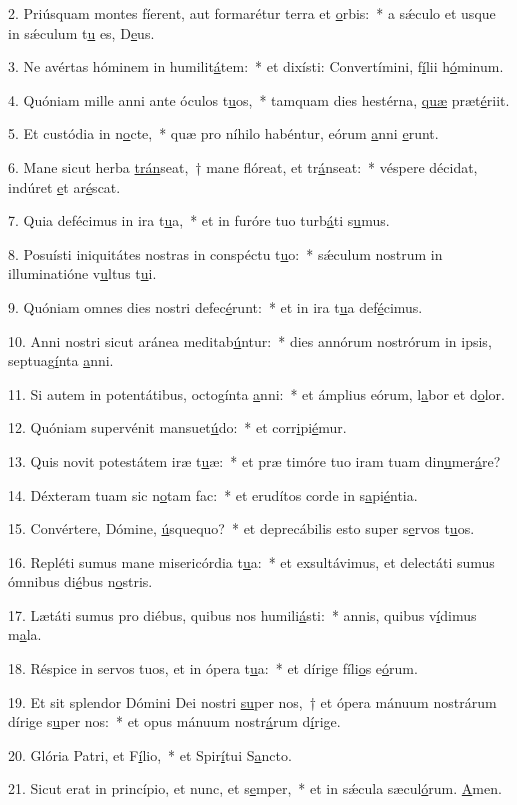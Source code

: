 2. Priúsquam montes fíerent, aut formarétur terra et \uline{o}rbis:~* a sǽculo et usque in sǽculum t\uline{u} es, D\uline{e}us.\par 
3. Ne avértas hóminem in humilit\uline{á}tem:~* et dixísti: Convertímini, f\uline{í}lii h\uline{ó}minum.\par 
4. Quóniam mille anni ante óculos t\uline{u}os,~* tamquam dies hestérna, \uline{quæ} præt\uline{é}riit.\par 
5. Et custódia in n\uline{o}cte,~* quæ pro níhilo habéntur, eórum \uline{a}nni \uline{e}runt.\par 
6. Mane sicut herba \uline{trán}seat,~† mane flóreat, et tr\uline{á}nseat:~* véspere décidat, indúret \uline{e}t ar\uline{é}scat.\par 
7. Quia defécimus in ira t\uline{u}a,~* et in furóre tuo turb\uline{á}ti s\uline{u}mus.\par 
8. Posuísti iniquitátes nostras in conspéctu t\uline{u}o:~* sǽculum nostrum in illuminatióne v\uline{u}ltus t\uline{u}i.\par 
9. Quóniam omnes dies nostri defec\uline{é}runt:~* et in ira t\uline{u}a def\uline{é}cimus.\par 
10. Anni nostri sicut aránea meditab\uline{ú}ntur:~* dies annórum nostrórum in ipsis, septuag\uline{í}nta \uline{a}nni.\par 
11. Si autem in potentátibus, octogínta \uline{a}nni:~* et ámplius eórum, l\uline{a}bor et d\uline{o}lor.\par 
12. Quóniam supervénit mansuet\uline{ú}do:~* et corr\uline{i}pi\uline{é}mur.\par 
13. Quis novit potestátem iræ t\uline{u}æ:~* et præ timóre tuo iram tuam din\uline{u}mer\uline{á}re?\par 
14. Déxteram tuam sic n\uline{o}tam fac:~* et erudítos corde in s\uline{a}pi\uline{é}ntia.\par 
15. Convértere, Dómine, \uline{ú}squequo?~* et deprecábilis esto super s\uline{e}rvos t\uline{u}os.\par 
16. Repléti sumus mane misericórdia t\uline{u}a:~* et exsultávimus, et delectáti sumus ómnibus di\uline{é}bus n\uline{o}stris.\par 
17. Lætáti sumus pro diébus, quibus nos humili\uline{á}sti:~* annis, quibus v\uline{í}dimus m\uline{a}la.\par 
18. Réspice in servos tuos, et in ópera t\uline{u}a:~* et dírige fíli\uline{o}s e\uline{ó}rum.\par 
19. Et sit splendor Dómini Dei nostri \uline{su}per nos,~† et ópera mánuum nostrárum dírige s\uline{u}per nos:~* et opus mánuum nostr\uline{á}rum d\uline{í}rige.\par 
20. Glória Patri, et F\uline{í}lio,~* et Spir\uline{í}tui S\uline{a}ncto.\par 
21. Sicut erat in princípio, et nunc, et s\uline{e}mper,~* et in sǽcula sæcul\uline{ó}rum. \uline{A}men.\par 
